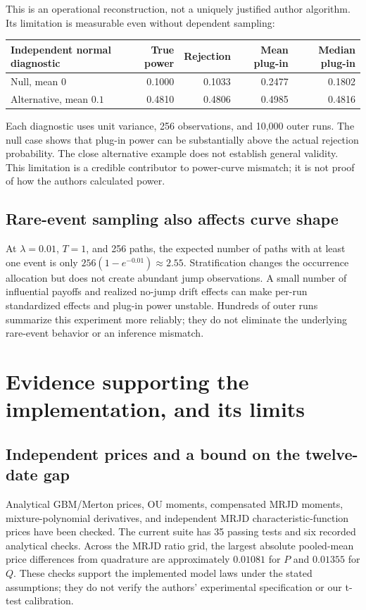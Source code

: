 \documentclass[11pt,a4paper]{article}
\begin{document}
This is an operational reconstruction, not a uniquely justified author
algorithm. Its limitation is measurable even without dependent sampling:
\begin{center}\small
\begin{tabular}{@{}lrrrr@{}}
\toprule
Independent normal diagnostic & True power & Rejection & Mean plug-in & Median plug-in\\
\midrule
Null, mean $0$ & 0.1000 & 0.1033 & 0.2477 & 0.1802\\
Alternative, mean $0.1$ & 0.4810 & 0.4806 & 0.4985 & 0.4816\\
\bottomrule
\end{tabular}
\end{center}
Each diagnostic uses unit variance, 256 observations, and 10,000 outer
runs. The null case shows that plug-in power can be substantially above
the actual rejection probability. The close alternative example does
not establish general validity. This limitation is a credible contributor
to power-curve mismatch; it is not proof of how the authors calculated power.

\subsection{Rare-event sampling also affects curve shape}
At $\lambda=0.01$, $T=1$, and 256 paths, the expected number of paths
with at least one event is only
$256(1-e^{-0.01})\approx2.55$. Stratification changes the occurrence
allocation but does not create abundant jump observations. A small
number of influential payoffs and realized no-jump drift effects can
make per-run standardized effects and plug-in power unstable. Hundreds
of outer runs summarize this experiment more reliably; they do not
eliminate the underlying rare-event behavior or an inference mismatch.

\clearpage
\section{Evidence supporting the implementation, and its limits}
\subsection{Independent prices and a bound on the twelve-date gap}
Analytical GBM/Merton prices, OU moments, compensated MRJD moments,
mixture-polynomial derivatives, and independent MRJD characteristic-function
prices have been checked. The current suite has 35 passing tests and
six recorded analytical checks. Across the MRJD ratio grid, the largest
absolute pooled-mean price differences from quadrature are approximately
$0.01081$ for $P$ and $0.01355$ for $Q$. These checks support the
implemented model laws under the stated assumptions; they do not
verify the authors' experimental specification or our t-test calibration.
\end{document}
